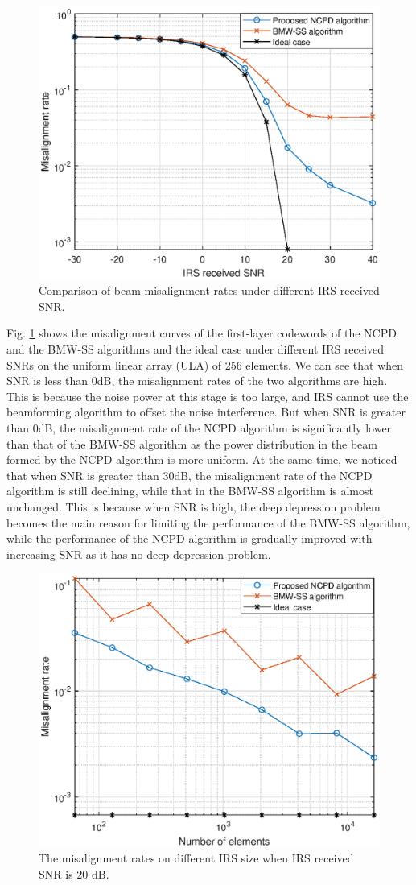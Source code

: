\documentclass[12pt,draftclsnofoot,onecolumn]{IEEEtran}
\begin{document}
	\begin{figure} 
		\centering
		\includegraphics[width=.5\textwidth]{misrate_SNR.eps}
		\caption{  Comparison of beam misalignment rates under different IRS received SNR. }  \label{f4} 
	\end{figure}
	
	Fig. \ref{f4} shows the misalignment curves of the first-layer codewords of the NCPD  and the BMW-SS algorithms and the ideal case under different IRS received SNRs on the uniform linear array (ULA) of 256 elements. We can see that when  SNR is less than 0dB, the misalignment rates of the two algorithms are high. This is because the noise power at this stage is too large, and  IRS cannot use the beamforming algorithm to offset the noise interference. But when  SNR is greater than 0dB, the misalignment rate of the NCPD algorithm is significantly lower than that of the BMW-SS algorithm  as the power distribution in the beam formed by the NCPD algorithm is more uniform. At the same time, we noticed that when  SNR is greater than 30dB, the misalignment rate of the NCPD algorithm is still declining, while that in the BMW-SS algorithm is almost unchanged. This is because when  SNR is high, the deep depression problem becomes the main reason for limiting the performance of the BMW-SS algorithm, while the performance of the NCPD algorithm is gradually improved with increasing SNR as it has no deep depression problem.
	
	\begin{figure}
		\centering
		\includegraphics[width=.5\textwidth]{misrate_ant_20.eps}
		\caption{  The misalignment rates on different IRS size when IRS received SNR is 20 dB. }  \label{f5} 
	\end{figure}
	
\end{document}
